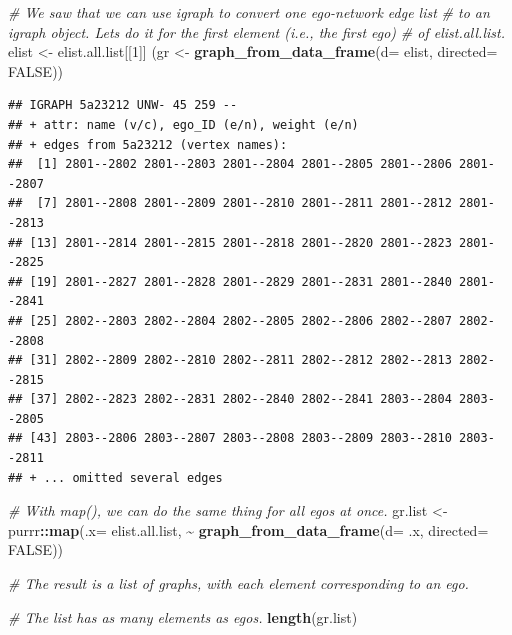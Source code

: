 \documentclass[
]{book}
\newenvironment{Shaded}{\begin{snugshade}}{\end{snugshade}}
\newcommand{\AttributeTok}[1]{\textcolor[rgb]{0.13,0.29,0.53}{#1}}
\newcommand{\CommentTok}[1]{\textcolor[rgb]{0.56,0.35,0.01}{\textit{#1}}}
\newcommand{\ConstantTok}[1]{\textcolor[rgb]{0.56,0.35,0.01}{#1}}
\newcommand{\DecValTok}[1]{\textcolor[rgb]{0.00,0.00,0.81}{#1}}
\newcommand{\FunctionTok}[1]{\textcolor[rgb]{0.13,0.29,0.53}{\textbf{#1}}}
\newcommand{\NormalTok}[1]{#1}
\newcommand{\OtherTok}[1]{\textcolor[rgb]{0.56,0.35,0.01}{#1}}
\newcommand{\SpecialCharTok}[1]{\textcolor[rgb]{0.81,0.36,0.00}{\textbf{#1}}}
\begin{document}
\begin{Shaded}
\begin{Highlighting}[]
\CommentTok{\# We saw that we can use igraph to convert one ego{-}network edge list}
\CommentTok{\# to an igraph object. Let\textquotesingle{}s do it for the first element (i.e., the first ego)}
\CommentTok{\# of elist.all.list.}
\NormalTok{elist }\OtherTok{\textless{}{-}}\NormalTok{ elist.all.list[[}\DecValTok{1}\NormalTok{]]}
\NormalTok{(gr }\OtherTok{\textless{}{-}} \FunctionTok{graph\_from\_data\_frame}\NormalTok{(}\AttributeTok{d=}\NormalTok{ elist, }\AttributeTok{directed=} \ConstantTok{FALSE}\NormalTok{))}
\end{Highlighting}
\end{Shaded}

\begin{verbatim}
## IGRAPH 5a23212 UNW- 45 259 -- 
## + attr: name (v/c), ego_ID (e/n), weight (e/n)
## + edges from 5a23212 (vertex names):
##  [1] 2801--2802 2801--2803 2801--2804 2801--2805 2801--2806 2801--2807
##  [7] 2801--2808 2801--2809 2801--2810 2801--2811 2801--2812 2801--2813
## [13] 2801--2814 2801--2815 2801--2818 2801--2820 2801--2823 2801--2825
## [19] 2801--2827 2801--2828 2801--2829 2801--2831 2801--2840 2801--2841
## [25] 2802--2803 2802--2804 2802--2805 2802--2806 2802--2807 2802--2808
## [31] 2802--2809 2802--2810 2802--2811 2802--2812 2802--2813 2802--2815
## [37] 2802--2823 2802--2831 2802--2840 2802--2841 2803--2804 2803--2805
## [43] 2803--2806 2803--2807 2803--2808 2803--2809 2803--2810 2803--2811
## + ... omitted several edges
\end{verbatim}

\begin{Shaded}
\begin{Highlighting}[]
\CommentTok{\# With map(), we can do the same thing for all egos at once.}
\NormalTok{gr.list }\OtherTok{\textless{}{-}}\NormalTok{ purrr}\SpecialCharTok{::}\FunctionTok{map}\NormalTok{(}\AttributeTok{.x=}\NormalTok{ elist.all.list, }
                      \SpecialCharTok{\textasciitilde{}} \FunctionTok{graph\_from\_data\_frame}\NormalTok{(}\AttributeTok{d=}\NormalTok{ .x, }\AttributeTok{directed=} \ConstantTok{FALSE}\NormalTok{))}

\CommentTok{\# The result is a list of graphs, with each element corresponding to an ego.}

\CommentTok{\# The list has as many elements as egos.}
\FunctionTok{length}\NormalTok{(gr.list)}
\end{Highlighting}
\end{Shaded}
\end{document}
